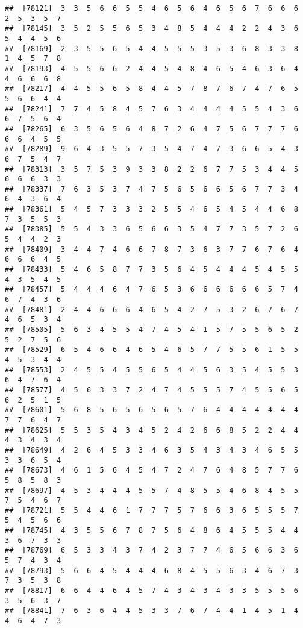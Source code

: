 \documentclass[
]{book}
\begin{document}
\begin{verbatim}
##  [78121]  3  3  5  6  6  5  5  4  6  5  6  4  6  5  6  7  6  6  6  2  5  3  5  7
##  [78145]  3  5  2  5  5  6  5  3  4  8  5  4  4  4  2  2  4  3  6  5  4  4  5  6
##  [78169]  2  3  5  5  6  5  4  4  5  5  5  3  5  3  6  8  3  3  8  1  4  5  7  8
##  [78193]  4  5  5  6  6  2  4  4  5  4  8  4  6  5  4  6  3  6  4  4  6  6  6  8
##  [78217]  4  4  5  5  6  5  8  4  4  5  7  8  7  6  7  4  7  6  5  5  6  6  4  4
##  [78241]  7  7  4  5  8  4  5  7  6  3  4  4  4  4  5  5  4  3  6  6  7  5  6  4
##  [78265]  6  3  5  6  5  6  4  8  7  2  6  4  7  5  6  7  7  7  6  6  6  4  5  5
##  [78289]  9  6  4  3  5  5  7  3  5  4  7  4  7  3  6  6  5  4  3  6  7  5  4  7
##  [78313]  3  5  7  5  3  9  3  3  8  2  2  6  7  7  5  3  4  4  5  6  6  6  3  3
##  [78337]  7  6  3  5  3  7  4  7  5  6  5  6  6  5  6  7  7  3  4  6  4  3  6  4
##  [78361]  5  4  5  7  3  3  3  2  5  5  4  6  5  4  5  4  4  6  8  7  3  5  5  3
##  [78385]  5  5  4  3  3  6  5  6  6  3  5  4  7  7  3  5  7  2  6  5  4  4  2  3
##  [78409]  3  4  4  7  4  6  6  7  8  7  3  6  3  7  7  6  7  6  4  6  6  6  4  5
##  [78433]  5  4  6  5  8  7  7  3  5  6  4  5  4  4  4  5  4  5  5  4  3  5  4  5
##  [78457]  5  4  4  4  6  4  7  6  5  3  6  6  6  6  6  6  5  7  4  6  7  4  3  6
##  [78481]  2  4  4  6  6  6  4  6  5  4  2  7  5  3  2  6  7  6  7  4  6  5  3  4
##  [78505]  5  6  3  4  5  5  4  7  4  5  4  1  5  7  5  5  6  5  2  5  2  7  5  6
##  [78529]  6  5  4  6  6  4  6  5  4  6  5  7  7  5  5  6  1  5  5  4  5  3  4  4
##  [78553]  2  4  5  5  4  5  5  6  5  4  4  5  6  3  5  4  5  5  3  6  4  7  6  4
##  [78577]  4  5  6  3  3  7  2  4  7  4  5  5  5  7  4  5  5  6  5  6  2  5  1  5
##  [78601]  5  6  8  5  6  5  6  5  6  5  7  6  4  4  4  4  4  4  4  7  7  6  4  7
##  [78625]  5  5  3  5  4  3  4  5  2  4  2  6  6  8  5  2  2  4  4  4  3  4  3  4
##  [78649]  4  2  6  4  5  3  3  4  6  3  5  4  3  4  3  4  6  5  5  3  3  6  5  4
##  [78673]  4  6  1  5  6  4  5  4  7  2  4  7  6  4  8  5  7  7  6  5  8  5  8  3
##  [78697]  4  5  3  4  4  4  5  5  7  4  8  5  5  4  6  8  4  5  5  7  5  4  6  7
##  [78721]  5  5  4  4  6  1  7  7  7  5  7  6  6  3  6  5  5  5  7  5  4  5  6  6
##  [78745]  4  3  5  5  6  7  8  7  5  6  4  8  6  4  5  5  5  4  4  3  6  7  3  3
##  [78769]  6  5  3  3  4  3  7  4  2  3  7  7  4  6  5  6  6  3  6  5  7  4  3  4
##  [78793]  5  6  6  4  5  4  4  4  6  8  4  5  5  6  3  4  6  7  3  7  3  5  3  8
##  [78817]  6  6  4  4  6  4  5  7  4  3  4  3  4  3  3  5  5  5  6  3  5  6  3  7
##  [78841]  7  6  3  6  4  4  5  3  3  7  6  7  4  4  1  4  5  1  4  4  6  4  7  3

\end{verbatim}
\end{document}
